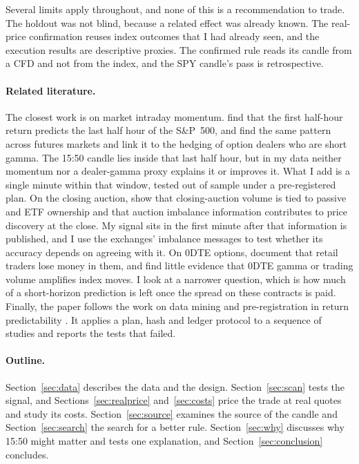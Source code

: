 \documentclass[12pt,letterpaper]{article}
\begin{document}
Several limits apply throughout, and none of this is a recommendation to trade.
The holdout was not blind, because a related effect was already known. The
real-price confirmation reuses index outcomes that I had already seen, and the
execution results are descriptive proxies. The confirmed rule reads its candle
from a CFD and not from the index, and the SPY candle's pass is retrospective.

\paragraph{Related literature.} The closest work is on market intraday momentum. \citet{ghlz2018} find
that the first half-hour return predicts the last half hour of the S\&P~500, and
\citet{bdlm2021} find the same pattern across futures markets and link it to the
hedging of option dealers who are short gamma. The 15:50 candle lies inside that
last half hour, but in my data neither momentum nor a dealer-gamma proxy explains it
or improves it. What I add is a single minute within that window, tested out of
sample under a pre-registered plan. On the closing auction, \citet{bm2023} show that closing-auction volume is tied to
passive and ETF ownership and that auction imbalance information contributes to
price discovery at the close. My signal sits in the first minute after that information is published, and I
use the exchanges' imbalance messages to test whether its accuracy depends on
agreeing with it. On 0DTE options, \citet{bbg2023} document that retail
traders lose money in them, and \citet{dev2024} find little evidence that 0DTE
gamma or trading volume amplifies index moves. I look at a narrower question, which is how much of a short-horizon prediction
is left once the spread on these contracts is paid. Finally, the paper follows
the work on data mining and pre-registration in return predictability
\citep{harvey2016,nosek2018}. It applies a plan, hash and ledger protocol to a
sequence of studies and reports the tests that failed.

\paragraph{Outline.} Section~\ref{sec:data} describes the data and the design.
Section~\ref{sec:scan} tests the signal, and Sections~\ref{sec:realprice}
and~\ref{sec:costs} price the trade at real quotes and study its costs.
Section~\ref{sec:source} examines the source of the candle and
Section~\ref{sec:search} the search for a better rule. Section~\ref{sec:why}
discusses why 15:50 might matter and tests one explanation, and
Section~\ref{sec:conclusion} concludes.
\end{document}
